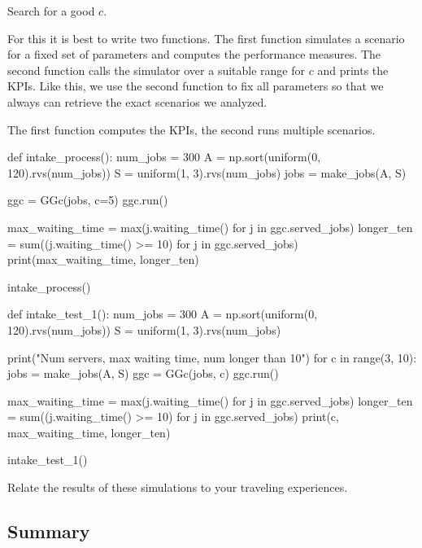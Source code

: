 \begin{exercise}
  Search for a good $c$.
\begin{hint}
  For this it is best to write two functions. The first function simulates a scenario for a fixed set of parameters and computes the performance measures. The second  function calls the simulator over a suitable range for $c$ and prints the KPIs. Like this, we use  the second function to fix all parameters so that we always can retrieve the exact scenarios we analyzed.
\end{hint}

\begin{solution}
The first function computes the KPIs, the second runs multiple scenarios.

\begin{pyverbatim}
def intake_process():
    num_jobs = 300
    A = np.sort(uniform(0, 120).rvs(num_jobs))
    S = uniform(1, 3).rvs(num_jobs)
    jobs = make_jobs(A, S)

    ggc = GGc(jobs, c=5)
    ggc.run()

    max_waiting_time = max(j.waiting_time() for j in ggc.served_jobs)
    longer_ten = sum((j.waiting_time() >= 10) for j in ggc.served_jobs)
    print(max_waiting_time, longer_ten)


intake_process()

def intake_test_1():
    num_jobs = 300
    A = np.sort(uniform(0, 120).rvs(num_jobs))
    S = uniform(1, 3).rvs(num_jobs)

    print("Num servers, max waiting time, num longer than 10")
    for c in range(3, 10):
        jobs = make_jobs(A, S)
        ggc = GGc(jobs, c)
        ggc.run()

        max_waiting_time = max(j.waiting_time() for j in ggc.served_jobs)
        longer_ten = sum((j.waiting_time() >= 10) for j in ggc.served_jobs)
        print(c, max_waiting_time, longer_ten)


intake_test_1()
\end{pyverbatim}
\end{solution}
\end{exercise}


\begin{exercise}
  Relate the results of these simulations to your traveling experiences.
\end{exercise}


\subsection{Summary}
\label{sec:summary}


